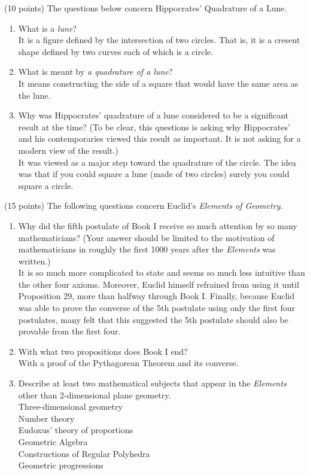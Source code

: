 \documentclass[11pt]{article}
\begin{document}
\item (10 points) The questions below concern Hippocrates' Quadrature of a Lune.
	\begin{enumerate}
	\item What is a \emph{lune}?\\
	It is a figure defined by the intersection of two circles. That is, it is a cresent shape defined by two curves each of which is a circle.
	\item What is meant by \emph{a quadrature of a lune}?\\
	It means constructing the side of a square that would have the same area as the lune.
	\item Why was Hippocrates' quadrature of a lune considered to be a significant result at the time? (To be clear, this questions is asking why Hippocrates' and his contemporaries viewed this result as important. It is not asking for a modern view of the result.)\\
	It was viewed as a major step toward the quadrature of the circle. The idea was that if you could square a lune (made of two circles) surely you could square a circle.
	\end{enumerate}
\item (15 points) The following questions concern Euclid's \emph{Elements of Geometry}.
	\begin{enumerate}
	\item Why did the fifth postulate of Book I receive so much attention by so many mathematicians? (Your answer should be limited to the motivation of mathematicians in roughly the first 1000 years after the \emph{Elements} was written.)\\
	It is so much more complicated to state and seems so much less intuitive than the other four axioms. Moreover, Euclid himself refrained from using it until Proposition 29, more than halfway through Book I. Finally, because Euclid was able to prove the converse of the 5th postulate using only the first four postulates, many felt that this suggested the 5th postulate should also be provable from the first four.
	
	\item With what two propositions does Book I end?\\
	
	With a proof of the Pythagorean Theorem and its converse.
	
	\item Describe at least two mathematical subjects that appear in the \emph{Elements} other than 2-dimensional plane geometry.\\
	
	Three-dimensional geometry\\
	Number theory\\
	Eudoxus' theory of proportions\\
	Geometric Algebra\\
	Constructions of Regular Polyhedra\\
	Geometric progressions\\
	\end{enumerate}
\end{document}
